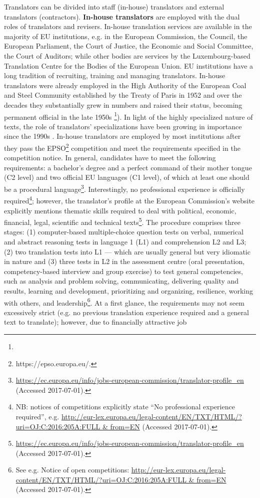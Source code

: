 \documentclass[output=paper]{langsci/langscibook}
\begin{document}
Translators can be divided into staff (in-house) translators and external translators (contractors). \textbf{In-house translators} are employed with the dual roles of translators and revisers. In-house translation services are available in the majority of EU institutions, e.g. in the European Commission, the Council, the European Parliament, the Court of Justice, the Economic and Social Committee, the Court of Auditors; while other bodies are services by the Luxembourg-based Translation Centre for the Bodies of the European Union. EU institutions have a long tradition of recruiting, training and managing translators. In-house translators were already employed in the High Authority of the European Coal and Steel Community established by the Treaty of Paris in 1952 and over the decades they substantially grew in numbers and raised their status, becoming permanent official in the late 1950s  \citep[18]{European2010}\footnote{}). In light of the highly specialized nature of texts, the role of translators’ specializations have been growing in importance since the 1990s \citep[12, 13]{European2010}. In-house translators are employed by most institutions after they pass the EPSO\footnote{https://epso.europa.eu/.} competition and meet the requirements specified in the competition notice. In general, candidates have to meet the following requirements: a bachelor’s degree and a perfect command of their mother tongue (C2 level) and two official EU languages (C1 level), of which at least one should be a procedural language\footnote{\url{https://ec.europa.eu/info/jobs-european-commission/translator-profile_en} (Accessed 2017-07-01).}. Interestingly, no professional experience is officially required\footnote{NB: notices of competitions explicitly state “No professional experience required”, e.g. \url{http://eur-lex.europa.eu/legal-content/EN/TXT/HTML/?uri=OJ:C:2016:205A:FULL & from=EN} (Accessed 2017-07-01).}; however, the translator’s profile at the European Commission’s website explicitly mentions thematic skills required to deal with political, economic, financial, legal, scientific and technical texts\footnote{\url{https://ec.europa.eu/info/jobs-european-commission/translator-profile_en} (Accessed 2017-07-01).}. The procedure comprises three stages: (1) computer-based multiple-choice question tests on verbal, numerical and abstract reasoning tests in language 1 (L1) and comprehension L2 and L3; (2) two translation tests into L1 — which are usually general but very idiomatic in nature and (3) three tests in L2 in the assessment centre (oral presentation, competency-based interview and group exercise) to test general competencies, such as analysis and problem solving, communicating, delivering quality and results, learning and development, prioritizing and organizing, resilience, working with others, and leadership\footnote{See e.g. Notice of open competitions: \url{http://eur-lex.europa.eu/legal-content/EN/TXT/HTML/?uri=OJ:C:2016:205A:FULL & from=EN} (Accessed 2017-07-01).}. At a first glance, the requirements may not seem excessively strict (e.g. no previous translation experience required and a general text to translate); however, due to financially attractive job 
\end{document}
